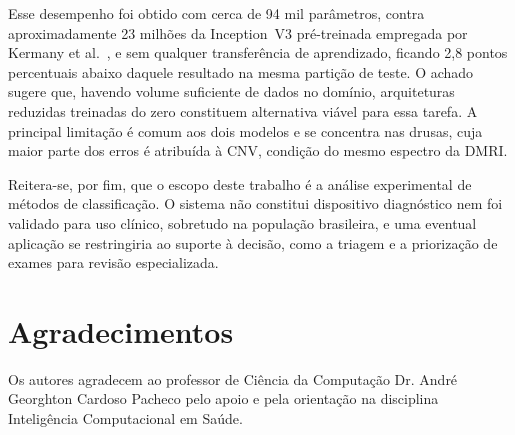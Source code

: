 \documentclass[conference]{IEEEtran}
\begin{document}
Esse desempenho foi obtido com cerca de 94 mil parâmetros, contra aproximadamente 23 milhões da Inception~V3 pré-treinada empregada por Kermany et al.~\cite{kermany2018}, e sem qualquer transferência de aprendizado, ficando 2,8 pontos percentuais abaixo daquele resultado na mesma partição de teste. O achado sugere que, havendo volume suficiente de dados no domínio, arquiteturas reduzidas treinadas do zero constituem alternativa viável para essa tarefa. A principal limitação é comum aos dois modelos e se concentra nas drusas, cuja maior parte dos erros é atribuída à CNV, condição do mesmo espectro da DMRI.

Reitera-se, por fim, que o escopo deste trabalho é a análise experimental de métodos de classificação. O sistema não constitui dispositivo diagnóstico nem foi validado para uso clínico, sobretudo na população brasileira, e uma eventual aplicação se restringiria ao suporte à decisão, como a triagem e a priorização de exames para revisão especializada.

\section*{Agradecimentos}

Os autores agradecem ao professor de Ciência da Computação Dr. André Georghton Cardoso Pacheco pelo apoio e pela orientação na disciplina Inteligência Computacional em Saúde.



\end{document}
